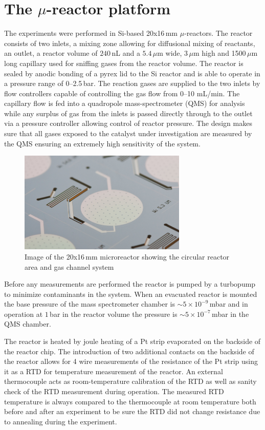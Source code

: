 \documentclass[8.5pt,twoside,twocolumn]{article}
\begin{document}
\section{The $\mu$-reactor platform}
The experiments were performed in Si-based 20x16\,mm $\mu$-reactors\cite{Henriksen2009}. The reactor consists of two inlets, a mixing zone allowing for diffusional mixing of reactants, an outlet, a reactor volume of $240\,$nL and a $5.4\,\mu$m wide, 3\,$\mu$m high and 1500\,$\mu$m long capillary used for sniffing gases from the reactor volume. The reactor is sealed by anodic bonding of a pyrex lid to the Si reactor and is able to operate in a pressure range of 0--2.5\,bar. The reaction gases are supplied to the two inlets by flow controllers capable of controlling the gas flow from 0--10 mL/min. The capillary flow is fed into a quadropole mass-spectrometer (QMS) for analysis while any surplus of gas from the inlets is passed directly through to the outlet via a pressure controller allowing control of reactor pressure. The design makes sure that all gases exposed to the catalyst under investigation are measured by the QMS ensuring an extremely high sensitivity of the system. 

\begin{figure}[h]
  \centering
  \includegraphics[width=8cm]{reactor.jpg}
  \caption{Image of the 20x16\,mm microreactor showing the circular reactor area and gas channel system}
  \label{fgr:reactor}
\end{figure}


Before any measurements are performed the reactor is pumped by a turbopump to minimize contaminants in the system. When an evacuated reactor is mounted the base pressure of the mass spectrometer chamber is $\sim5\times10^{-9}\,$mbar and in operation at $1\,$bar in the reactor volume the pressure is $\sim5\times10^{-7}\,$mbar in the QMS chamber. 

The reactor is heated by joule heating of a Pt strip evaporated on the backside of the reactor chip. The introduction of two additional contacts on the backside of the reactor allows for 4 wire measurements of the resistance of the Pt strip using it as a RTD for temperature measurement of the reactor. An external thermocouple acts as room-temperature calibration of the RTD as well as sanity check of the RTD measurement during operation. The measured RTD temperature is always compared to the thermocouple at room temperature both before and after an experiment to be sure the RTD did not change resistance due to annealing during the experiment.
\end{document}
